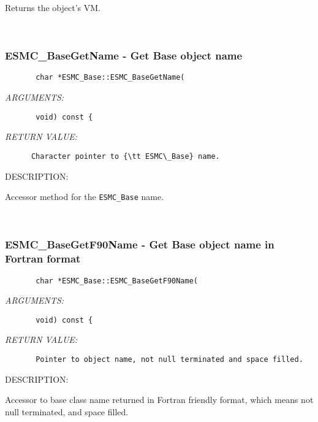       Returns the object's VM.
   
 
\mbox{}\hrulefill\
 
\subsubsection [ESMC\_BaseGetName] {ESMC\_BaseGetName - Get Base object name}


  
\begin{verbatim}       char *ESMC_Base::ESMC_BaseGetName(\end{verbatim}{\em ARGUMENTS:}
\begin{verbatim}       void) const {\end{verbatim}{\em RETURN VALUE:}
\begin{verbatim}      Character pointer to {\tt ESMC\_Base} name.\end{verbatim}
{\sf DESCRIPTION:\\ }


      Accessor method for the {\tt ESMC\_Base} name.
   
 
\mbox{}\hrulefill\
 
\subsubsection [ESMC\_BaseGetF90Name] {ESMC\_BaseGetF90Name - Get Base object name in Fortran format}


  
\begin{verbatim}       char *ESMC_Base::ESMC_BaseGetF90Name(\end{verbatim}{\em ARGUMENTS:}
\begin{verbatim}       void) const {\end{verbatim}{\em RETURN VALUE:}
\begin{verbatim}       Pointer to object name, not null terminated and space filled.\end{verbatim}
{\sf DESCRIPTION:\\ }


       Accessor to base class name returned in Fortran friendly format, which
       means not null terminated, and space filled.
   
 

